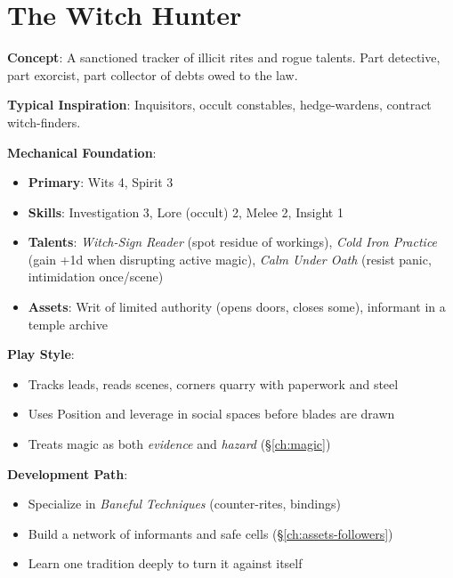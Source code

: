 \section{The Witch Hunter}

\textbf{Concept}: A sanctioned tracker of illicit rites and rogue talents. Part detective, part exorcist, part collector of debts owed to the law.

\textbf{Typical Inspiration}: Inquisitors, occult constables, hedge-wardens, contract witch-finders.

\textbf{Mechanical Foundation}:
\begin{itemize}
  \item \textbf{Primary}: Wits 4, Spirit 3
  \item \textbf{Skills}: Investigation 3, Lore (occult) 2, Melee 2, Insight 1 
  \item \textbf{Talents}: \emph{Witch-Sign Reader} (spot residue of workings), \emph{Cold Iron Practice} (gain +1d when disrupting active magic), \emph{Calm Under Oath} (resist panic, intimidation once/scene) 
  \item \textbf{Assets}: Writ of limited authority (opens doors, closes some), informant in a temple archive
\end{itemize}

\textbf{Play Style}:
\begin{itemize}
  \item Tracks leads, reads scenes, corners quarry with paperwork and steel
  \item Uses Position and leverage in social spaces before blades are drawn
  \item Treats magic as both \emph{evidence} and \emph{hazard} (\S\ref{ch:magic}) 
\end{itemize}

\textbf{Development Path}:
\begin{itemize}
  \item Specialize in \emph{Baneful Techniques} (counter-rites, bindings)
  \item Build a network of informants and safe cells (\S\ref{ch:assets-followers})
  \item Learn one tradition deeply to turn it against itself
\end{itemize}

